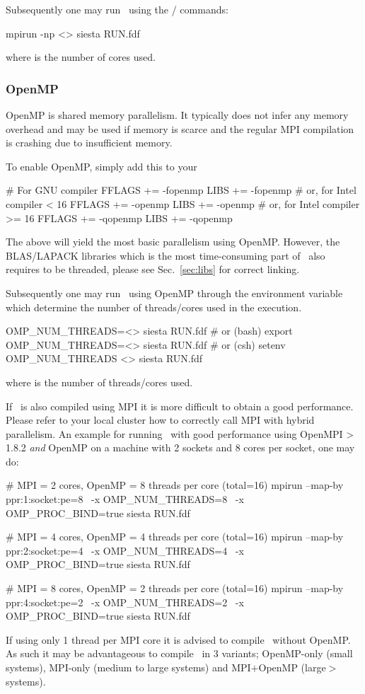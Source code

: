 Subsequently one may run \siesta\ using the
/ commands:
\begin{shellexample}
  mpirun -np <> siesta RUN.fdf
\end{shellexample}
where \shell{<>} is the number of cores used.


\subsubsection{OpenMP}

OpenMP is shared memory parallelism. It typically does not infer any
memory overhead and may be used if memory is scarce and the regular
MPI compilation is crashing due to insufficient memory.

To enable OpenMP, simply add this to your 
\begin{shellexample}
  # For GNU compiler
  FFLAGS += -fopenmp
  LIBS += -fopenmp
  # or, for Intel compiler < 16
  FFLAGS += -openmp
  LIBS += -openmp
  # or, for Intel compiler >= 16
  FFLAGS += -qopenmp
  LIBS += -qopenmp
\end{shellexample}
The above will yield the most basic parallelism using OpenMP. However,
the BLAS/LAPACK libraries which is the most time-consuming part of
\siesta\ also requires to be threaded, please see Sec.~\ref{sec:libs}
for correct linking.

Subsequently one may run \siesta\ using OpenMP through the environment
variable  which determine the number of
threads/cores used in the execution.
\begin{shellexample}
  OMP_NUM_THREADS=<> siesta RUN.fdf
  # or (bash)
  export OMP_NUM_THREADS=<>
  siesta RUN.fdf
  # or (csh)
  setenv OMP_NUM_THREADS <>
  siesta RUN.fdf
\end{shellexample}
where \shell{<>} is the number of threads/cores used.

If \siesta\ is also compiled using MPI it is more difficult to obtain
a good performance. Please refer to your local cluster how to
correctly call MPI with hybrid parallelism.
%
An example for running \siesta\ with good performance using OpenMPI >
1.8.2 \emph{and} OpenMP on a machine with 2 sockets and 8 cores per
socket, one may do:
\begin{shellexample}
  # MPI = 2 cores, OpenMP = 8 threads per core (total=16)
  mpirun --map-by ppr:1:socket:pe=8 \
     -x OMP_NUM_THREADS=8 \
     -x OMP_PROC_BIND=true siesta RUN.fdf

  # MPI = 4 cores, OpenMP = 4 threads per core (total=16)
  mpirun --map-by ppr:2:socket:pe=4 \
     -x OMP_NUM_THREADS=4 \
     -x OMP_PROC_BIND=true siesta RUN.fdf

  # MPI = 8 cores, OpenMP = 2 threads per core (total=16)
  mpirun --map-by ppr:4:socket:pe=2 \
     -x OMP_NUM_THREADS=2 \
     -x OMP_PROC_BIND=true siesta RUN.fdf
\end{shellexample}
If using only 1 thread per MPI core it is advised to compile \siesta\
without OpenMP. As such it may be advantageous to compile \siesta\ in
3 variants; OpenMP-only (small systems), MPI-only (medium to large
systems) and MPI$+$OpenMP (large$>$ systems).

